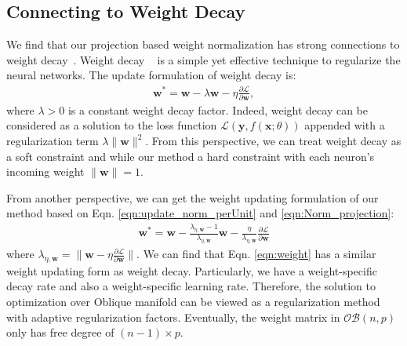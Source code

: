 \documentclass[twocolumn]{article}
\begin{document}
\subsection{Connecting to Weight Decay}
We find that our projection based weight normalization has strong connections to weight decay~\cite{1992_WD_Krogh}. Weight decay ~\cite{1992_WD_Krogh} is a simple yet effective technique to regularize the neural networks. The update formulation of weight decay is:
    \begin{eqnarray}
\label{eqn:WD}
\mathbf{w}^*= \mathbf{w}- \lambda \mathbf{w} - \eta \frac{\partial \mathcal{L} }{\partial \mathbf{w}},
\end{eqnarray}
where $\lambda>0$ is a constant weight decay factor. Indeed, weight decay can be considered as a solution to the loss function $\mathcal{L}(\mathbf{y}, f(\mathbf{x}; \theta))$ appended with a regularization term $\lambda \| \mathbf{w} \|^2$. From this perspective, we can treat weight decay as a soft constraint and while our method a hard constraint with each neuron's incoming weight $\| \mathbf{w}\|=1$.


From another perspective, we can get the weight updating formulation of our method based on Eqn. \ref{eqn:update_norm_perUnit}
and \ref{eqn:Norm_projection}:
\begin{eqnarray}
 \label{eqn:weight}
\mathbf{w}^*= \mathbf{w} - \frac{\lambda_{\eta,\mathbf{w}}-1 }{\lambda_{\eta,\mathbf{w}}} \mathbf{w}
- \frac{\eta}{\lambda_{\eta,\mathbf{w}} }\frac{\partial \mathcal{L} }{\partial \mathbf{w}}
\end{eqnarray}
where  $\lambda_{\eta,\mathbf{w}}= \| \mathbf{w} - \eta \frac{\partial \mathcal{L} }{\partial \mathbf{w}} \|$.
We can find that Eqn. \ref{eqn:weight} has a similar weight updating form as weight decay. Particularly, we have a weight-specific decay rate and also a weight-specific learning rate. Therefore, the solution to optimization over Oblique manifold can be viewed as a regularization method with adaptive regularization factors. Eventually, the weight matrix in $\mathcal{OB}(n,p)$ only has free degree of  $(n-1)\times p$.
\end{document}
